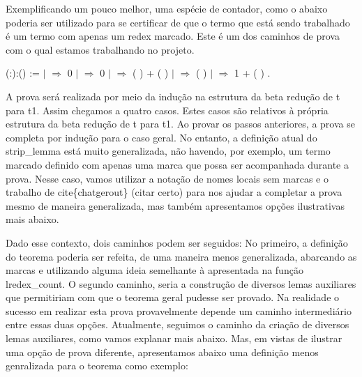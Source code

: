  Exemplificando um pouco melhor, uma espécie de contador, como o abaixo poderia ser utilizado para se certificar de que
o termo que está sendo trabalhado é um termo com apenas um redex marcado. Este é um dos caminhos de prova com o qual estamos
trabalhando no projeto.\begin{coqdoccode}
\coqdocemptyline
\coqdocnoindent
{}  (:):() :=\coqdoceol
\coqdocnoindent
{}  \coqdoceol
\coqdocindent{1.00em}
\ensuremath{|}   \ensuremath{\Rightarrow} 0\coqdoceol
\coqdocindent{1.00em}
\ensuremath{|}   \ensuremath{\Rightarrow} 0\coqdoceol
\coqdocindent{1.00em}
\ensuremath{|}    \ensuremath{\Rightarrow} ( ) + ( )\coqdoceol
\coqdocindent{1.00em}
\ensuremath{|}      \ensuremath{\Rightarrow} ( )\coqdoceol
\coqdocindent{1.00em}
\ensuremath{|}     \ensuremath{\Rightarrow} 1 + ( )\coqdoceol
\coqdocnoindent
{}.\coqdoceol
\coqdocemptyline
\coqdocemptyline
\coqdocemptyline
\end{coqdoccode}
A prova será realizada por meio da indução na estrutura da beta redução de t para t1. Assim chegamos a quatro
casos. Estes casos são relativos à própria estrutura da beta redução de t para t1. Ao provar os passos anteriores, 
a prova se completa por indução para o caso geral. No entanto, a definição atual do strip\_lemma
está muito generalizada, não havendo, por exemplo, um termo marcado definido com apenas uma marca que possa ser acompanhada
durante a prova. Nesse caso, vamos utilizar a notação de nomes locais sem marcas e o trabalho de cite\{chatgerout\} (citar certo)
para nos ajudar a completar a prova mesmo de maneira generalizada, mas também apresentamos opções ilustrativas mais abaixo.   

 Dado esse contexto, dois caminhos podem ser seguidos: No primeiro, a definição do teorema poderia ser refeita, de uma
maneira menos generalizada, abarcando as marcas e utilizando alguma ideia semelhante à apresentada na função lredex\_count. O segundo 
caminho, seria a construção de diversos lemas auxiliares que permitiriam com que o teorema geral pudesse ser provado. Na realidade
o sucesso em realizar esta prova provavelmente depende um caminho intermediário entre essas duas opções. Atualmente, seguimos o
caminho da criação de diversos lemas auxiliares, como vamos explanar mais abaixo. Mas, em vistas de ilustrar uma opção de prova 
diferente, apresentamos abaixo uma definição menos genralizada para o teorema como exemplo: 

